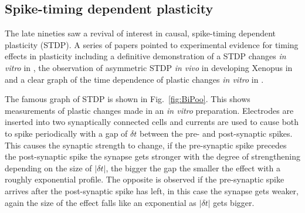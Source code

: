 \documentclass[12pt]{article}
\begin{document}
\subsection*{Spike-timing dependent plasticity}

The late nineties saw a revival of interest in causal, spike-timing
dependent plasticity (STDP). A series of papers pointed to experimental
evidence for timing effects in plasticity
\cite{MarkramSakmann1995a,MarkramEtAl1997a,BellEtAl1997a,MageeJohnston1997a,DebanneGahwilerThompson1998a}
including a definitive demonstration of a STDP changes \textsl{in vitro} in \cite{MarkramEtAl1997a}, the
observation of asymmetric STDP \textsl{in vivo} in developing Xenopus
in \cite{ZhangTaoHoltHarrisPoo1998a} and a clear graph of the time
dependence of plastic changes \textsl{in vitro} in \cite{BiPoo1998a}.

The famous graph of STDP is shown in
Fig.~\ref{fig:BiPoo}. This shows measurements of plastic changes made
in an \textsl{in vitro} preparation. Electrodes are inserted into two
synaptically connected cells and currents are used to cause both to
spike periodically with a gap of $\delta t$ between the pre- and
post-synaptic spikes. This causes the synaptic strength to change, if
the pre-synaptic spike precedes the post-synaptic spike the synapse
gets stronger with the degree of strengthening depending on the size
of $|\delta t|$, the bigger the gap the smaller the effect with a
roughly exponential profile. The opposite is observed if the
pre-synaptic spike arrives after the post-synaptic spike has left, in
this case the synapse gets weaker, again the size of the effect falls
like an exponential as $|\delta t|$ gets bigger.
\end{document}
